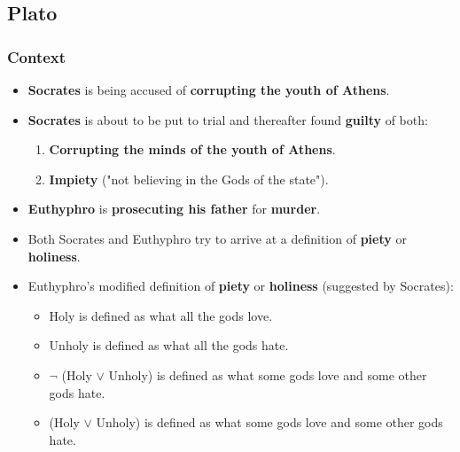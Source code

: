 \documentclass[11pt]{article}
\begin{document}
\subsection{Plato}
\label{sec:org84d9586}

\subsubsection{Context}
\label{sec:orga582f15}
\begin{itemize}
\item \textbf{Socrates} is being accused of \textbf{corrupting the youth of Athens}.
\item \textbf{Socrates} is about to be put to trial and thereafter found \textbf{guilty} of both:
\begin{enumerate}
\item \textbf{Corrupting the minds of the youth of Athens}.
\item \textbf{Impiety} ("not believing in the Gods of the state").
\end{enumerate}
\item \textbf{Euthyphro} is \textbf{prosecuting his father} for \textbf{murder}.
\item Both Socrates and Euthyphro try to arrive at a definition of \textbf{piety} or \textbf{holiness}.
\item Euthyphro's modified definition of \textbf{piety} or \textbf{holiness} (suggested by Socrates):
\begin{itemize}
\item Holy is defined as what all the gods love.
\item Unholy is defined as what all the gods hate.
\item \(\neg\) (Holy \(\vee\) Unholy) is defined as what some gods love and some other gods hate.
\item (Holy \(\vee\) Unholy) is defined as what some gods love and some other gods hate.
\end{itemize}
\end{itemize}
\end{document}
